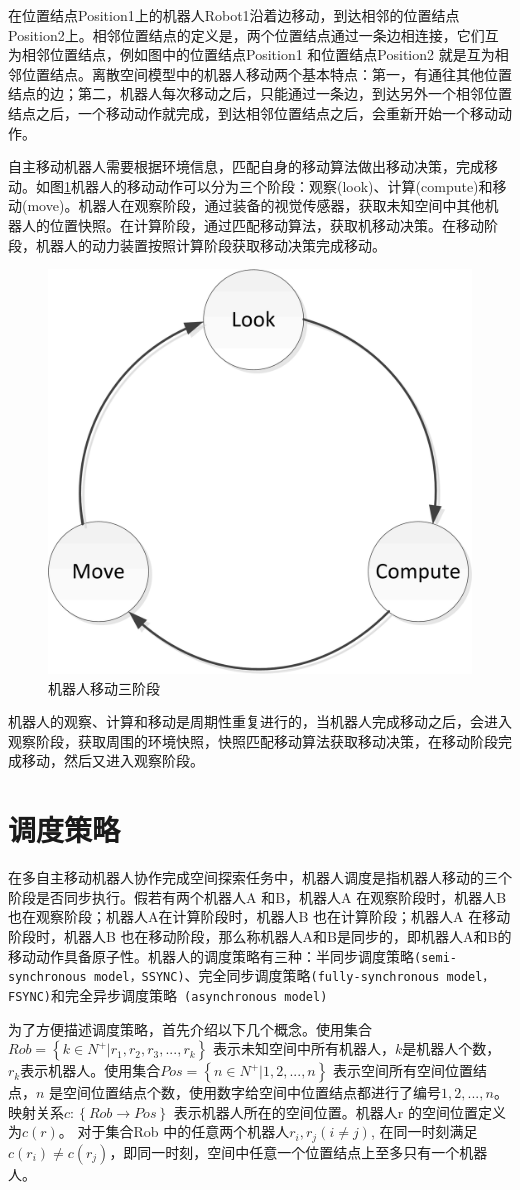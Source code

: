 在位置结点Position1上的机器人Robot1沿着边移动，到达相邻的位置结点Position2上。相邻位置结点的定义是，两个位置结点通过一条边相连接，它们互为相邻位置结点，例如图中的位置结点Position1 和位置结点Position2 就是互为相邻位置结点。离散空间模型中的机器人移动两个基本特点：第一，有通往其他位置结点的边；第二，机器人每次移动之后，只能通过一条边，到达另外一个相邻位置结点之后，一个移动动作就完成，到达相邻位置结点之后，会重新开始一个移动动作。

自主移动机器人需要根据环境信息，匹配自身的移动算法做出移动决策，完成移动。如图\ref{fig:robotthreephase}机器人的移动动作可以分为三个阶段：观察(look)、计算(compute)和移动(move)。机器人在观察阶段，通过装备的视觉传感器，获取未知空间中其他机器人的位置快照。在计算阶段，通过匹配移动算法，获取机移动决策。在移动阶段，机器人的动力装置按照计算阶段获取移动决策完成移动。

\begin{figure}[!hbt]
	\centering
	\includegraphics[width=2 in]{fig/robotthreephase.png}
	\caption{机器人移动三阶段}
	\label{fig:robotthreephase}
\end{figure}

机器人的观察、计算和移动是周期性重复进行的，当机器人完成移动之后，会进入观察阶段，获取周围的环境快照，快照匹配移动算法获取移动决策，在移动阶段完成移动，然后又进入观察阶段。

\section{调度策略}
在多自主移动机器人协作完成空间探索任务中，机器人调度是指机器人移动的三个阶段是否同步执行。假若有两个机器人A 和B，机器人A 在观察阶段时，机器人B也在观察阶段；机器人A在计算阶段时，机器人B 也在计算阶段；机器人A 在移动阶段时，机器人B 也在移动阶段，那么称机器人A和B是同步的，即机器人A和B的移动动作具备原子性。机器人的调度策略有三种：半同步调度策略\verb|(semi-synchronous model，SSYNC)|、完全同步调度策略\verb|(fully-synchronous model，FSYNC)|和完全异步调度策略\verb| (asynchronous model)|

为了方便描述调度策略，首先介绍以下几个概念。使用集合$Rob =\left\{k \in N^+ |r_1,r_2,r_3,...,r_k\right\}$ 表示未知空间中所有机器人，$k$是机器人个数，$r_k$表示机器人。使用集合$Pos =\left\{n \in N^+ |1,2,...,n\right\}$ 表示空间所有空间位置结点，$n$ 是空间位置结点个数，使用数字给空间中位置结点都进行了编号$1,2,...,n$。映射关系$c:\left\{Rob \rightarrow Pos\right\}$ 表示机器人所在的空间位置。机器人r 的空间位置定义为$c\left(r\right)$。 对于集合Rob 中的任意两个机器人$r_i,r_j\left(i \neq j \right)$, 在同一时刻满足$c\left(r_i\right) \neq c\left(r_j\right)$，即同一时刻，空间中任意一个位置结点上至多只有一个机器人。


